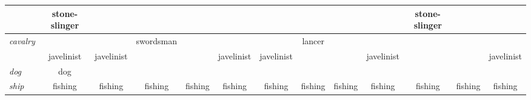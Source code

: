 \documentclass{article}
\begin{document}
\begin{landscape}
\begin{tabular}{l||c|c|c|c||c|c|c|c||c|c|c|c}
 & stone-slinger  &                &                &                &                &                &                &                &                & stone-slinger  &                &                \\
\hline\textit{cavalry}
 &                &                & swordsman      &                &                &                & lancer         &                &                &                &                &                \\
 & javelinist     & javelinist     &                &                & javelinist     & javelinist     &                &                & javelinist     &                &                & javelinist     \\
\hline\textit{dog}
 & dog            &                &                &                &                &                &                &                &                &                &                &                \\
\hline\textit{ship}
 & fishing        & fishing        & fishing        & fishing        & fishing        & fishing        & fishing        & fishing        & fishing        & fishing        & fishing        & fishing        \\


\end{tabular}
\end{landscape}
\end{document}

